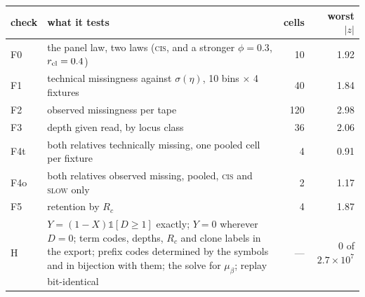 \begin{center}\small
\begin{tabular}{@{}l p{} r r@{}}
\toprule
check & what it tests & cells & worst $|z|$ \\
\midrule
F0  & the panel law, two laws (\textsc{cis}, and a stronger $\phi=0.3$, $r_{\rm cl}=0.4$)      & 10  & 1.92 \\
F1  & technical missingness against $\sigma(\eta)$, 10 bins $\times$ 4 fixtures                & 40  & 1.84 \\
F2  & observed missingness per tape                                                             & 120 & 2.98 \\
F3  & depth given read, by locus class                                                          & 36  & 2.06 \\
F4t & both relatives technically missing, one pooled cell per fixture                           & 4   & 0.91 \\
F4o & both relatives observed missing, pooled, \textsc{cis} and \textsc{slow} only              & 2   & 1.17 \\
F5  & retention by $R_c$                                                                        & 4   & 1.87 \\
H   & $Y=(1-X)\mathbb 1[D\ge1]$ exactly; $Y=0$ wherever $D=0$; term codes, depths, $R_c$ and clone
      labels in the export; prefix codes determined by the symbols and in bijection with them;
      the solve for $\mu_\beta$; replay bit-identical
      & --- & $0$ of $2.7{\times}10^{7}$ \\
\bottomrule
\end{tabular}
\end{center}

